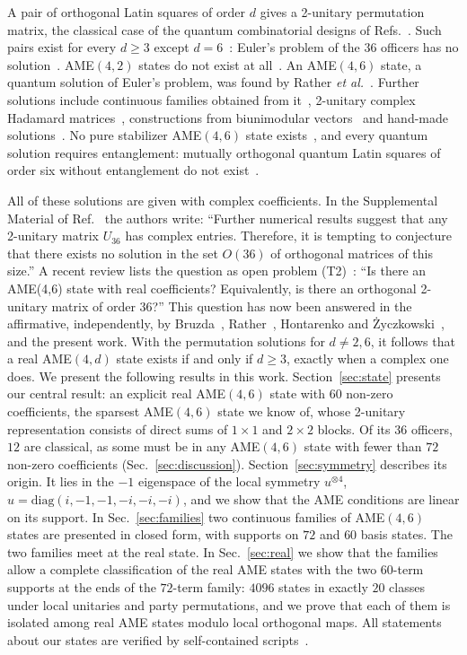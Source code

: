\documentclass[aps,pra,reprint,superscriptaddress,amsmath,amssymb,longbibliography]{revtex4-2}
\theoremstyle{plain}
\begin{document}
A pair of orthogonal Latin squares of order $d$ gives a 2-unitary permutation matrix, the classical case of the quantum
combinatorial designs of Refs.~\cite{GALRZ15,GRMZ2018}.  Such pairs exist for every
$d\ge3$ except $d=6$~\cite{BSP1960}: Euler's problem of the $36$ officers has no
solution~\cite{Euler1782,Tarry1900}.  AME$(4,2)$ states do not exist at all~\cite{HS2000}.  An AME$(4,6)$ state, a
quantum solution of Euler's problem, was found by Rather \emph{et al.}~\cite{RBB22}.  Further solutions include
continuous families obtained from it~\cite{RRKL23}, 2-unitary complex Hadamard matrices~\cite{BZ24}, constructions
from biunimodular vectors~\cite{Rat24} and hand-made solutions~\cite{GG25}.  No pure stabilizer AME$(4,6)$ state
exists~\cite{WMBA26,Cha26}, and every quantum solution requires entanglement: mutually orthogonal quantum Latin
squares of order six without entanglement do not exist~\cite{BS26}.

All of these solutions are given with complex coefficients.  In the Supplemental Material of Ref.~\cite{RBB22} the authors write:
``Further numerical results suggest that any 2-unitary matrix $U_{36}$ has complex entries.  Therefore, it is
tempting to conjecture that there exists no solution in the set $O(36)$ of orthogonal matrices of this size.''  A
recent review lists the question as open problem (T2)~\cite{RBRLZ26}: ``Is there an AME(4,6) state with real
coefficients? Equivalently, is there an orthogonal 2-unitary matrix of order 36?''
This question has now been answered in the affirmative, independently, by Bruzda~\cite{Bru26},
Rather~\cite{Rat26}, Hontarenko and \.Zyczkowski~\cite{HZ26}, and the present work.  With the permutation solutions for $d\neq2,6$, it follows that a real
AME$(4,d)$ state exists if and only if $d\ge3$, exactly when a complex one does.  We present the following results in this work.
Section~\ref{sec:state} presents our central result: an explicit real AME$(4,6)$ state with $60$ non-zero coefficients, the sparsest AME$(4,6)$ state we know of,
whose 2-unitary representation consists of direct sums of $1\times1$ and $2\times2$ blocks.  Of its $36$ officers, $12$ are
classical, as some must be in any AME$(4,6)$ state with fewer than $72$ non-zero coefficients (Sec.~\ref{sec:discussion}).
Section~\ref{sec:symmetry} describes its origin.  It lies in the $-1$ eigenspace of the local symmetry
$u^{\otimes4}$, $u=\mathrm{diag}(i,-1,-1,-i,-i,-i)$, and we show that the AME conditions are linear on its support.
In Sec.~\ref{sec:families} two continuous families of AME$(4,6)$ states are presented in closed form, with supports on $72$ and $60$ basis states.  The two families meet at the real state.  In Sec.~\ref{sec:real} we show that the families allow a complete classification of the real AME states with the two $60$-term supports at the ends of the $72$-term family: $4096$ states in exactly $20$ classes under local unitaries and party permutations, and we prove that each of them is isolated among real AME states modulo local orthogonal maps.
All statements about our states are verified by self-contained scripts~\cite{repo}.
\end{document}
